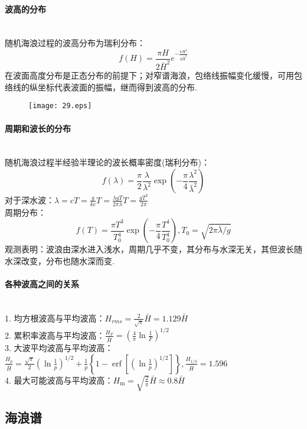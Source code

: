 \documentclass[a4paper,12pt]{article}
\begin{document}
    \paragraph{波高的分布}~{}\\
    随机海浪过程的波高分布为瑞利分布：
    \[
        f(H)=\frac{\pi H}{2\bar{H}^2}e^{-\frac{\pi H^2}{4\bar{H}^2}}
    \]
    在波面高度分布是正态分布的前提下；对窄谱海浪，包络线振幅变化缓慢，可用包络线的纵坐标代表波面的振幅，继而得到波高的分布.
    \begin{figure}[H]
        \centering\texttt{[image: 29.eps]}
        \caption*{}
    \end{figure}
    \paragraph{周期和波长的分布}~{}\\
    随机海浪过程半经验半理论的波长概率密度(瑞利分布)：
    \[
        f(\lambda)=\frac{\pi}{2} \frac{\lambda}{\lambda^{2}} \exp \left(-\frac{\pi}{4} \frac{\lambda^{2}}{\bar{\lambda}^{2}}\right)
    \]
    对于深水波：$\displaystyle \lambda=c T=\frac{g}{k c} T=\frac{\lambda g T}{2 \pi \lambda} T=\frac{g T^{2}}{2 \pi}$\\
    周期分布：
    \[
        f(T)=\frac{\pi T^{3}}{T_{0}^{4}} \exp \left(-\frac{\pi}{4} \frac{T^{4}}{T_{0}^{4}}\right),T_{0}=\sqrt{2 \pi \bar{\lambda} / g}
    \]
    观测表明：波浪由深水进入浅水，周期几乎不变，其分布与水深无关，其但波长随水深改变，分布也随水深而变.
    \paragraph{各种波高之间的关系}~{}\\
    1. 均方根波高与平均波高：$\displaystyle H_{rms}=\frac{2}{\sqrt{\pi}}\bar{H}=1.129\bar{H}$\\
    2. 累积率波高与平均波高：$\displaystyle \frac{H_{F}}{\bar{H}}=\left(\frac{4}{\pi} \ln \frac{1}{F}\right)^{1 / 2}$\\
    3. 大波平均波高与平均波高：$\displaystyle \frac{H_{p}}{\bar{H}}=\frac{\sqrt{\pi}}{2}\left(\ln \frac{1}{p}\right)^{1 / 2}+\frac{1}{p}\left\{1-\operatorname{erf}\left[\left(\ln \frac{1}{p}\right)^{1 / 2}\right]\right\},\frac{H_{1 / 3}}{\bar{H}}=1.596$\\
    4. 最大可能波高与平均波高：$\displaystyle H_{\mathrm{m}}=\sqrt{\frac{2}{\pi}} \bar{H} \approx 0.8 \bar{H}$\\
    \subsection{海浪谱}
\end{document}
